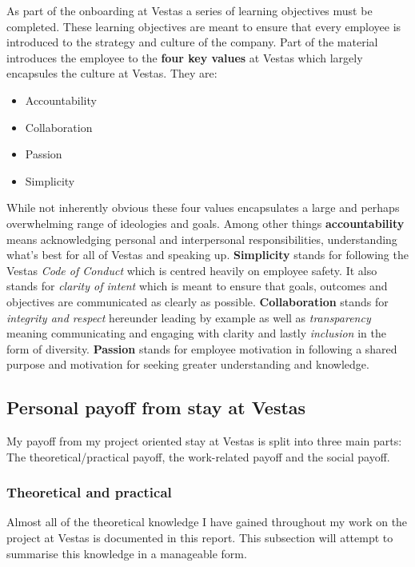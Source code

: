 \medskip
\noindent As part of the onboarding at Vestas a series of learning objectives must be completed. These learning objectives are meant to ensure that every employee is introduced to the strategy and culture of the company. Part of the material introduces the employee to the \textbf{four key values} at Vestas which largely encapsules the culture at Vestas. They are: 
\begin{itemize}
	\item Accountability
	\item Collaboration
	\item Passion
	\item Simplicity
\end{itemize}
While not inherently obvious these four values encapsulates a large and perhaps overwhelming range of ideologies and goals. Among other things \textbf{accountability} means acknowledging personal and interpersonal responsibilities, understanding what's best for all of Vestas and speaking up. \textbf{Simplicity} stands for following the Vestas \textit{Code of Conduct} which is centred heavily on employee safety. It also stands for \textit{clarity of intent} which is meant to ensure that goals, outcomes and objectives are communicated as clearly as possible. \textbf{Collaboration} stands for \textit{integrity and respect} hereunder leading by example as well as \textit{transparency} meaning communicating and engaging with clarity and lastly \textit{inclusion} in the form of diversity. \textbf{Passion} stands for employee motivation in following a shared purpose and motivation for seeking greater understanding and knowledge.



\subsection{Personal payoff from stay at Vestas}
My payoff from my project oriented stay at Vestas is split into three main parts: The theoretical/practical payoff, the work-related payoff and the social payoff.


\subsubsection{Theoretical and practical}
Almost all of the theoretical knowledge I have gained throughout my work on the project at Vestas is documented in this report. This subsection will attempt to summarise this knowledge in a manageable form.

